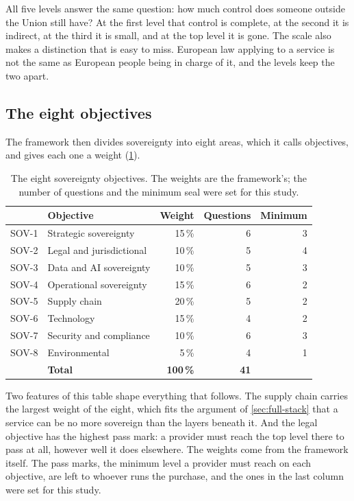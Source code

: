 All five levels answer the same question: how much control does someone outside the
Union still have? At the first level that control is complete, at the second it is
indirect, at the third it is small, and at the top level it is gone. The scale also
makes a distinction that is easy to miss. European law applying to a service is not
the same as European people being in charge of it, and the levels keep the two
apart.

\subsection*{The eight objectives}

The framework then divides sovereignty into eight areas, which it calls objectives,
and gives each one a weight (\cref{tab:sov-objectives}).

\begin{table}[htbp]
  \centering
  \caption{The eight sovereignty objectives. The weights are the framework's;
           the number of questions and the minimum seal were set for this study.}
  \label{tab:sov-objectives}
  \small
  \begin{tabularx}{\textwidth}{@{}l X r r r@{}}
    \toprule
    & \textbf{Objective} & \textbf{Weight} & \textbf{Questions} & \textbf{Minimum} \\
    \midrule
    SOV-1 & Strategic sovereignty      & 15\,\% & 6 & 3 \\
    SOV-2 & Legal and jurisdictional   & 10\,\% & 5 & 4 \\
    SOV-3 & Data and AI sovereignty    & 10\,\% & 5 & 3 \\
    SOV-4 & Operational sovereignty    & 15\,\% & 6 & 2 \\
    SOV-5 & Supply chain               & 20\,\% & 5 & 2 \\
    SOV-6 & Technology                 & 15\,\% & 4 & 2 \\
    SOV-7 & Security and compliance    & 10\,\% & 6 & 3 \\
    SOV-8 & Environmental              &  5\,\% & 4 & 1 \\
    \midrule
    & \textbf{Total}                   & \textbf{100\,\%} & \textbf{41} & \\
    \bottomrule
  \end{tabularx}
\end{table}

Two features of this table shape everything that follows. The supply chain carries
the largest weight of the eight, which fits the argument of \cref{sec:full-stack}
that a service can be no more sovereign than the layers beneath it. And the legal
objective has the highest pass mark: a provider must reach the top level there to
pass at all, however well it does elsewhere. The weights come from the framework
itself. The pass marks, the minimum level a provider must reach on each objective,
are left to whoever runs the purchase, and the ones in the last column were set for
this study.

